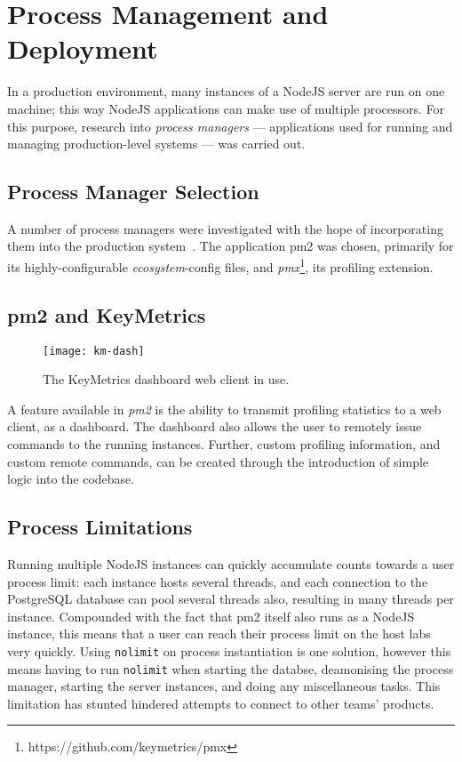 \section{Process Management and Deployment}\label{sec:pm}
In a production environment, many instances of a NodeJS server are run on
one machine; this way NodeJS applications can make use of multiple
processors. For this purpose, research into \emph{process managers} ---
applications used for running and managing production-level systems ---
was carried out.

\subsection{Process Manager Selection}\label{sec:pms}
A number of process managers were investigated with the hope of
incorporating them into the production
system~\cite{strongloop}\cite{pm2}\cite{forever}. The application pm2 was
chosen, primarily for its highly-configurable \emph{ecosystem}-config files,
and \emph{pmx}\footnote{https://github.com/keymetrics/pmx},
its profiling extension.

\subsection{pm2 and KeyMetrics}\label{sec:pm2}

\begin{figure}
	\centering
	\texttt{[image: km-dash]}
	\caption{The KeyMetrics dashboard web client in use.}\label{fig:dash}
\end{figure}

A feature available in \emph{pm2} is the ability to transmit profiling
statistics to a web client, as a dashboard. The dashboard also allows the
user to remotely issue commands to the running instances. Further,
custom profiling information, and custom remote commands, can be created
through the introduction of simple logic into the codebase.

\subsection{Process Limitations}\label{sec:plim}
Running multiple NodeJS instances can quickly accumulate counts towards a
user process limit: each instance hosts several threads, and each connection
to the PostgreSQL database can pool several threads also, resulting in many
threads per instance. Compounded with the fact that pm2 itself also runs
as a NodeJS instance, this means that a user can reach their process limit
on the host labs very quickly. Using \texttt{nolimit} on process
instantiation is one solution, however this means having to run
\texttt{nolimit} when starting the databse, deamonising the process manager,
starting the server instances, and doing any miscellaneous tasks. This
limitation has stunted hindered attempts to connect to other teams'
products.

